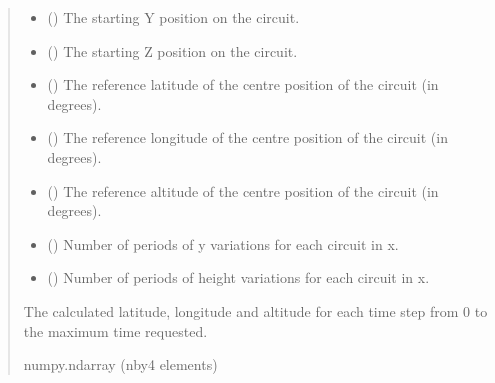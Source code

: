 \documentclass[letterpaper,10pt,english]{sphinxmanual}
\begin{document}
\begin{fulllineitems}
\begin{quote}
\begin{description}
\begin{itemize}
\item {} 
\sphinxAtStartPar
{} () \textendash{} The starting Y position on the circuit.

\item {} 
\sphinxAtStartPar
{} () \textendash{} The starting Z position on the circuit.

\item {} 
\sphinxAtStartPar
{} () \textendash{} The reference latitude of the centre position of the
circuit (in degrees).

\item {} 
\sphinxAtStartPar
{} () \textendash{} The reference longitude of the centre position of the
circuit (in degrees).

\item {} 
\sphinxAtStartPar
{} () \textendash{} The reference altitude of the centre position of the
circuit (in degrees).

\item {} 
\sphinxAtStartPar
{} () \textendash{} Number of periods of y variations for each circuit in x.

\item {} 
\sphinxAtStartPar
{} () \textendash{} Number of periods of height variations for each circuit in x.

\end{itemize}

\sphinxAtStartPar
The calculated latitude, longitude and altitude for each time
step from 0 to the maximum time requested.

\sphinxAtStartPar
numpy.ndarray (n\sphinxhyphen{}by\sphinxhyphen{}4 elements)

\end{description}\end{quote}

\end{fulllineitems}
\end{document}
